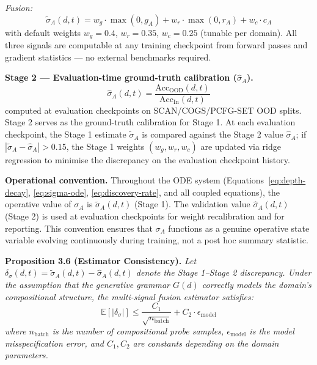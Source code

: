 \documentclass[11pt,a4paper]{article}
\begin{document}
\textit{Fusion:}
\begin{equation}\label{eq:fusion}
\tilde{\sigma}_A(d,t) = w_g \cdot \max(0, g_A) + w_r \cdot \max(0, r_A) + w_c \cdot c_A
\end{equation}
with default weights $w_g = 0.4$, $w_r = 0.35$, $w_c = 0.25$ (tunable per
domain). All three signals are computable at any training checkpoint from
forward passes and gradient statistics --- no external benchmarks required.

\textbf{Stage 2 --- Evaluation-time ground-truth calibration ($\hat{\sigma}_A$).}
\begin{equation}
\hat{\sigma}_A(d,t) = \frac{\text{Acc}_{\text{OOD}}(d,t)}{\text{Acc}_{\text{In}}(d,t)}
\label{eq:sgg-proxy}
\end{equation}
computed at evaluation checkpoints on SCAN/COGS/PCFG-SET OOD splits.
Stage 2 serves as the ground-truth calibration for Stage 1. At each
evaluation checkpoint, the Stage 1 estimate $\tilde{\sigma}_A$ is compared
against the Stage 2 value $\hat{\sigma}_A$; if
$|\tilde{\sigma}_A - \hat{\sigma}_A| > 0.15$, the Stage 1 weights
$(w_g, w_r, w_c)$ are updated via ridge regression to minimise the
discrepancy on the evaluation checkpoint history.

\textbf{Operational convention.} Throughout the ODE system
(Equations~\eqref{eq:depth-decay}, \eqref{eq:sigma-ode},
\eqref{eq:discovery-rate}, and all coupled equations), the operative
value of $\sigma_A$ is $\tilde{\sigma}_A(d,t)$ (Stage 1). The validation
value $\hat{\sigma}_A(d,t)$ (Stage 2) is used at evaluation checkpoints
for weight recalibration and for reporting. This convention ensures that
$\sigma_A$ functions as a genuine operative state variable evolving
continuously during training, not a post hoc summary statistic.

\textbf{Proposition 3.6 (Estimator Consistency).}
\textit{Let $\delta_\sigma(d,t) = \tilde{\sigma}_A(d,t) - \hat{\sigma}_A(d,t)$
denote the Stage 1--Stage 2 discrepancy. Under the assumption that the
generative grammar $G(d)$ correctly models the domain's compositional
structure, the multi-signal fusion estimator satisfies:
\begin{equation}\label{eq:estimator-bound}
\mathbb{E}[|\delta_\sigma|] \leq \frac{C_1}{\sqrt{n_{\text{batch}}}} + C_2 \cdot \epsilon_{\text{model}}
\end{equation}
where $n_{\text{batch}}$ is the number of compositional probe samples,
$\epsilon_{\text{model}}$ is the model misspecification error, and $C_1, C_2$
are constants depending on the domain parameters.}
\end{document}

